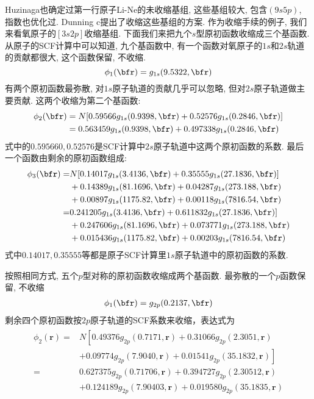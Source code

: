 Huzinaga也确定过第一行原子Li-Ne的未收缩基组, 这些基组较大, 包含$(9s5p)$, 指数也优化过. Dunning c提出了收缩这些基组的方案. 作为收缩手续的例子, 我们来看氧原子的$[3s2p]$收缩基组. 下面我们来把九个$s$型原初函数收缩成三个基函数. 从原子的SCF计算中可以知道, 九个基函数中, 有一个函数对氧原子的$1s$和$2s$轨道的贡献都很大, 这个函数保留, 不收缩.
\begin{equation}
\label{3.290}
\phi_1(\bfr)=g_{1s}(9.5322,\bfr)
\end{equation} 
有两个原初函数最弥散, 对$1s$原子轨道的贡献几乎可以忽略, 但对$2s$原子轨道做主要贡献. 这两个收缩为第二个基函数:
\begin{align}
\label{3.291}
\phi_2(\bfr) & = N[0.59566g_{1s}(0.9398,\bfr) + 0.52576 g_{1s}(0.2846,\bfr)]\notag\\
			 & = 0.563459 g_{1s}(0.9398,\bfr) + 0.497338 g_{1s}(0.2846,\bfr)
\end{align}
式中的$0.595660,0.52576$是SCF计算中$2s$原子轨道中这两个原初函数的系数. 最后一个函数由剩余的原初函数组成:
\begin{align}
\phi_3(\bfr) = &   N[0.14017g_{1s}(3.4136,\bfr) + 0.35555g_{1s}(27.1836,\bfr)] \notag\\
               & + 0.14389g_{1s}(81.1696,\bfr) + 0.04287 g_{1s}(273.188,\bfr) \notag\\
               & + 0.00897g_{1s}(1175.82,\bfr) + 0.00118g_{1s}(7816.54,\bfr) \notag\\
             = & 0.241205g_{1s}(3.4136,\bfr) + 0.611832g_{1s}(27.1836,\bfr)] \notag\\
             & + 0.247606g_{1s}(81.1696,\bfr) + 0.073771 g_{1s}(273.188,\bfr) \notag\\
             & + 0.015436g_{1s}(1175.82,\bfr) + 0.00203g_{1s}(7816.54,\bfr)
\end{align}
式中$0.14017, 0.35555$等都是原子SCF计算里$1s$原子轨道中的原初函数的系数.

按照相同方式, 五个$p$型对称的原初函数收缩成两个基函数. 最弥散的一个$p$函数保留, 不收缩
\begin{align}
\phi_1(\bfr) = g_{2p}(0.2137,\bfr)
\end{align}
剩余四个原初函数按$2p$原子轨道的SCF系数来收缩，表达式为
\begin{align}
\begin{aligned}
	\phi_{2}(\mathbf{r})=& N\left[0.49376 g_{2 p}(0.7171, \mathbf{r})+0.31066 g_{2 p}(2.3051, \mathbf{r})\right.\\
	&\left.+0.09774 g_{2 p}(7.9040, \mathbf{r})+0.01541 g_{2 p}(35.1832, \mathbf{r})\right] \\
	=& 0.627375 g_{2 p}(0.71706, \mathbf{r})+0.394727 g_{2 p}(2.30512, \mathbf{r}) \\
	&+0.124189 g_{2 p}(7.90403, \mathbf{r})+0.019580 g_{2 p}(35.1835, \mathbf{r})
\end{aligned}
\end{align}

